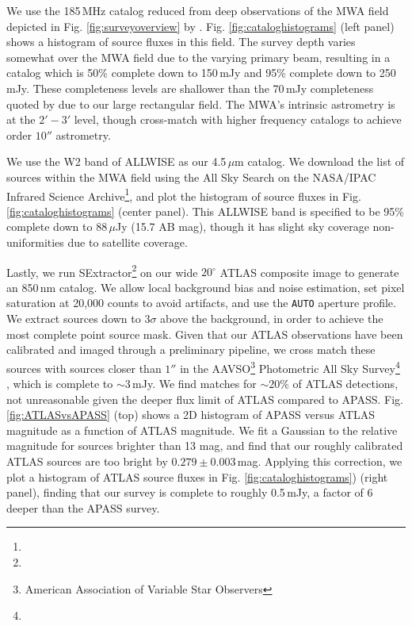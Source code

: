 \documentclass[numberedappendix]{emulateapj}
\begin{document}
We use the 185\,MHz catalog reduced from deep observations of the MWA field depicted in Fig. \ref{fig:surveyoverview} by \citet{PattiCatalog1}. Fig. \ref{fig:cataloghistograms} (left panel) shows a histogram of source fluxes in this field. The survey depth varies somewhat over the MWA field due to the varying primary beam, resulting in a catalog which is 50\% complete down to 150\,mJy and 95\% complete down to 250\,mJy. These completeness levels are shallower than the 70\,mJy completeness quoted by \citet{PattiCatalog1} due to our large rectangular field. The MWA's intrinsic astrometry is at the $2'-3'$ level, though \citep{PattiCatalog1} cross-match with higher frequency catalogs to achieve order $10''$ astrometry. 

We use the W2 band of ALLWISE \citep{Wright2010,allwise} as our 4.5\,$\mu$m catalog. We download the list of sources within the MWA field using the All Sky Search on the NASA/IPAC Infrared Science Archive\footnote{}, and plot the histogram of source fluxes in Fig. \ref{fig:cataloghistograms} (center panel). This ALLWISE band is specified to be 95\% complete down to 88\,$\mu$Jy (15.7 AB mag), though it has slight sky coverage non-uniformities due to satellite coverage.

Lastly, we run SExtractor\footnote{} \citep{sextractor} on our wide $20^\circ$ ATLAS composite image to generate an 850\,nm catalog. We allow local background bias and noise estimation, set pixel saturation at 20,000 counts to avoid artifacts, and use the {\tt AUTO} aperture profile. We extract sources down to $3\sigma$ above the background, in order to achieve the most complete point source mask. Given that our ATLAS observations have been calibrated and imaged through a preliminary pipeline, we cross match these sources with sources closer than $1''$ in the AAVSO\footnote{American Association of Variable Star Observers} Photometric All Sky Survey\footnote{} \citep{apass}, which is complete to $\sim3$\,mJy. We find matches for $\sim20\%$ of ATLAS detections, not unreasonable given the deeper flux limit of ATLAS compared to APASS. Fig. \ref{fig:ATLASvsAPASS} (top) shows a 2D histogram of APASS versus ATLAS magnitude as a function of ATLAS magnitude. We fit a Gaussian to the relative magnitude for sources brighter than 13 mag, and find that our roughly calibrated ATLAS sources are too bright by $0.279\pm0.003$\,mag. Applying this correction, we plot a histogram of ATLAS source fluxes in Fig. \ref{fig:cataloghistograms}) (right panel), finding that our survey is complete to roughly 0.5\,mJy, a factor of 6 deeper than the APASS survey.
\end{document}
